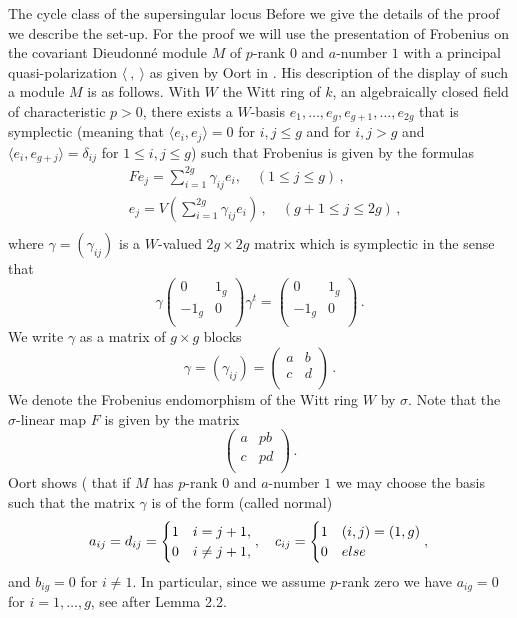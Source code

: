 \documentclass[11pt]{amsart}
\numberwithin{equation}{section}
\theoremstyle{definition}
\theoremstyle{remark}
\begin{document}
\begin{section}{The cycle class of the supersingular locus}
Before we give the details of the proof we describe the set-up.
For the proof we will use the presentation of Frobenius on the
covariant Dieudonn\'e module $M$ of $p$-rank $0$ and $a$-number $1$
with a principal quasi-polarization $\langle \ , \ \rangle$ 
as given by Oort in \cite{Oort-AM152}.
His description of the display of such a module $M$ is as follows.
With $W$ the Witt ring of $k$, an algebraically closed field of
characteristic $p>0$,  
there exists a $W$-basis $e_1,\ldots,e_g,e_{g+1},\ldots,e_{2g}$ that is symplectic
(meaning that 
$\langle e_i,e_j \rangle = 0$ for $i,j\leq g$
and for $i,j > g$ and
$\langle e_i,e_{g+j} \rangle = \delta_{ij}$ for $1\leq i,j \leq g$) 
such that Frobenius is given by the formulas
$$
\begin{aligned}
&Fe_j=\sum_{i=1}^{2g} \gamma_{ij} e_i, \quad (1\leq j \leq g)\, , \\
&e_{j}=V(\sum_{i=1}^{2g} \gamma_{ij}e_i)\, ,
\quad  (g+1\leq  j \leq 2g)\, ,\\
\end{aligned}
$$
where $\gamma=(\gamma_{ij})$
is a $W$-valued $2g\times 2g$ matrix which is symplectic in the sense that
$$
\gamma \left( \begin{matrix} 0 & 1_g \\ -1_g & 0 \\ \end{matrix} \right)
\gamma^t= \left( \begin{matrix} 0 & 1_g \\ -1_g & 0 \\ \end{matrix} \right)\, .
$$
We write $\gamma$ as a matrix of $g \times g$ blocks 
$$
\gamma=(\gamma_{ij})=\left(\begin{matrix} a & b \\ c & d \\ \end{matrix}\right)\, .
$$
We denote the Frobenius endomorphism of the Witt ring $W$ by $\sigma$.
Note that the $\sigma$-linear map $F$ is given by the matrix
$$
\left( \begin{matrix} a & pb \\ c & pd \\ \end{matrix} \right)\, .
$$
Oort shows (\cite[p.\ 191]{Oort-AM152} that if $M$ has $p$-rank $0$ and $a$-number $1$ 
we may choose the basis
such that the matrix $\gamma$ is of the form (called normal)
$$
a_{ij}=d_{ij}=\begin{cases} 1 & i=j+1, \\ 0 & i\neq j+1, \\ \end{cases}, \quad
c_{ij}=\begin{cases} 1 & (i,j)=(1,g) \\ 0 & else \\ \end{cases}, \\
$$
and $b_{ig}=0$ for $i\neq 1$. In particular, since we assume $p$-rank zero 
we have $a_{ig}=0$
for $i=1,\ldots,g$, see \cite[page 191]{Oort-AM152} after Lemma 2.2.



\end{section}
\end{document}
